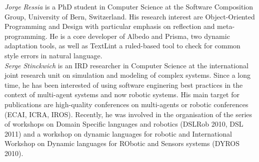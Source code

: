 \documentclass[runningheads]{llncs}
\begin{document}


\noindent \emph{Jorge Ressia} is a PhD student in Computer Science at the Software
Composition Group, University of Bern, Switzerland. His research
interest are Object-Oriented Programming and Design with particular
emphasis on reflection and meta-programming. He is a core developer of
Albedo and Prisma, two dynamic adaptation  tools, as well as TextLint
a ruled-based tool to check for common style errors in natural
language.\\


\noindent \emph{Serge Stinckwich} is an IRD researcher in Computer Science at the international joint research unit on simulation and modeling of complex systems. Since a long time, he has been interested of using software enginering best practices in the context of multi-agent systems and now robotic systems. His main target for publications are high-quality conferences on multi-agents or robotic conferences (ECAI, ICRA, IROS). Recently, he was involved in the organisation of the series of workshops on Domain Specific languages and robotics (DSLRob 2010, DSL 2011) and a workshop on dynamic languages for robotic and International Workshop on Dynamic languages for RObotic and Sensors systems (DYROS 2010).\\
\end{document}
